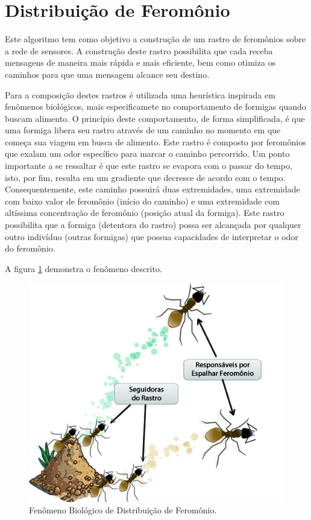 \section{Distribuição de Feromônio}
Este algoritmo tem como objetivo a construção de um rastro de feromônios sobre a rede de sensores. A construção deste rastro possibilita que cada \vant receba mensagens de
maneira mais rápida e mais eficiente, bem como otimiza os caminhos para que uma mensagem alcance seu destino.

Para a composição destes rastros é utilizada uma heurística inspirada em fenômenos biológicos, mais especificamete no comportamento de formigas quando buscam alimento.
O princípio deste comportamento, de forma simplificada,  é que uma formiga libera seu rastro através de um caminho no momento em que começa sua viagem em busca de alimento. Este rastro é composto por feromônios que exalam um odor específico para marcar o caminho percorrido. Um ponto importante a se ressaltar é que este rastro se evapora com o passar do tempo, isto, por fim, resulta em um gradiente que decresce de acordo com o tempo. Consequentemente, este caminho possuirá duas extremidades, uma extremidade com baixo valor de feromônio (início do caminho) e uma extremidade com altíssima concentração de feromônio (posição atual da formiga). Este rastro possibilita que a formiga (detentora do rastro) possa ser alcançada por qualquer outro indivíduo (outras formigas) que possua capacidades de interpretar o odor do feromônio.

A figura \ref{fig:ants} demonstra o fenômeno descrito.

 \begin{figure}[h!]
 \centering
 \includegraphics[width=12cm]{pictures/ants.png}
 \caption{Fenômeno Biológico de Distribuição de Feromônio.}
  \label{fig:ants}
 \end{figure}

